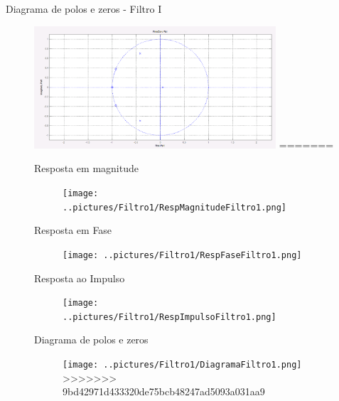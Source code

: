 \documentclass{beamer}
\begin{document}
	\begin{frame}{Diagrama de polos e zeros - Filtro I}
		\begin{figure}[ht]
			\centering
			\includegraphics[width=9cm]{../pictures/Filtro1/DiagramaFiltro1.png}
=======
	\begin{frame}{Resposta em magnitude}
		\begin{figure}[ht]
			\centering
			\texttt{[image: ..pictures/Filtro1/RespMagnitudeFiltro1.png]}
			\label{fig:magnitude1}
		\end{figure}
	\end{frame}
	\begin{frame}{Resposta em Fase}
		\begin{figure}[ht]
			\centering
			\texttt{[image: ..pictures/Filtro1/RespFaseFiltro1.png]}
			\label{fig:magnitude1}
		\end{figure}
	\end{frame}
	\begin{frame}{Resposta ao Impulso}
		\begin{figure}[ht]
			\centering
			\texttt{[image: ..pictures/Filtro1/RespImpulsoFiltro1.png]}
			\label{fig:magnitude1}
		\end{figure}
	\end{frame}
	\begin{frame}{Diagrama de polos e zeros}
		\begin{figure}[ht]
			\centering
			\texttt{[image: ..pictures/Filtro1/DiagramaFiltro1.png]}
>>>>>>> 9bd42971d433320de75bcb48247ad5093a031aa9
			\label{fig:magnitude1}
		\end{figure}
	\end{frame}


\end{figure}
\end{frame}
\end{document}
